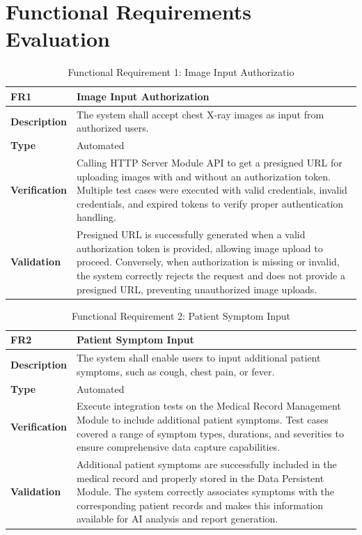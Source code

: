 \documentclass[12pt, titlepage]{article}
\begin{document}
\newpage


\section{Functional Requirements Evaluation}

\begin{table}[h!]
\centering
{}
\begin{tabular}{|p{3.5cm}|p{11.5cm}|}
\hline
\rowcolor{gray!30}
\textbf{FR1} & \textbf{Image Input Authorization} \\
\hline
\textbf{Description} & The system shall accept chest X-ray images as input from authorized users.\\
\hline
\textbf{Type} & Automated \\
\hline
\textbf{Verification} & Calling HTTP Server Module API to get a presigned URL for uploading images with and without an authorization token. Multiple test cases were executed with valid credentials, invalid credentials, and expired tokens to verify proper authentication handling. \\
\hline
\textbf{Validation} & Presigned URL is successfully generated when a valid authorization token is provided, allowing image upload to proceed. Conversely, when authorization is missing or invalid, the system correctly rejects the request and does not provide a presigned URL, preventing unauthorized image uploads. \\
\hline
\end{tabular}
\caption{Functional Requirement 1: Image Input Authorizatio}
\end{table}

\begin{table}[h!]
\centering
{}
\begin{tabular}{|p{3.5cm}|p{11.5cm}|}
\hline
\rowcolor{gray!30}
\textbf{FR2} & \textbf{Patient Symptom Input} \\
\hline
\textbf{Description} & The system shall enable users to input additional patient symptoms, such as cough, chest pain, or fever.\\
\hline
\textbf{Type} & Automated \\
\hline
\textbf{Verification} & Execute integration tests on the Medical Record Management Module to include additional patient symptoms. Test cases covered a range of symptom types, durations, and severities to ensure comprehensive data capture capabilities. \\
\hline
\textbf{Validation} & Additional patient symptoms are successfully included in the medical record and properly stored in the Data Persistent Module. The system correctly associates symptoms with the corresponding patient records and makes this information available for AI analysis and report generation. \\
\hline
\end{tabular}
\caption{Functional Requirement 2: Patient Symptom Input}
\end{table}
\end{document}
